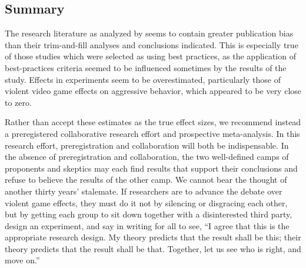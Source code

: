 \documentclass[man, mask]{apa6}
\begin{document}
\subsection{Summary}
The research literature as analyzed by \citet{Anderson:etal:2010} seems to contain greater publication bias than their trim-and-fill analyses and conclusions indicated. This is especially true of those studies which were selected as using best practices, as the application of best-practices criteria seemed to be influenced sometimes by the results of the study. Effects in experiments seem to be overestimated, particularly those of violent video game effects on aggressive behavior, which appeared to be very close to zero. 

Rather than accept these estimates as the true effect sizes, we recommend instead a preregistered collaborative research effort and prospective meta-analysis. In this research effort, preregistration and collaboration will both be indispensable. In the absence of preregistration and collaboration, the two well-defined camps of proponents and skeptics may each find results that support their conclusions and refuse to believe the results of the other camp. We cannot bear the thought of another thirty years' stalemate. If researchers are to advance the debate over violent game effects, they must do it not by silencing or disgracing each other, but by getting each group to sit down together with a disinterested third party, design an experiment, and say in writing for all to see, ``I agree that this is the appropriate research design. My theory predicts that the result shall be this; their theory predicts that the result shall be that. Together, let us see who is right, and move on.''

\end{document}
